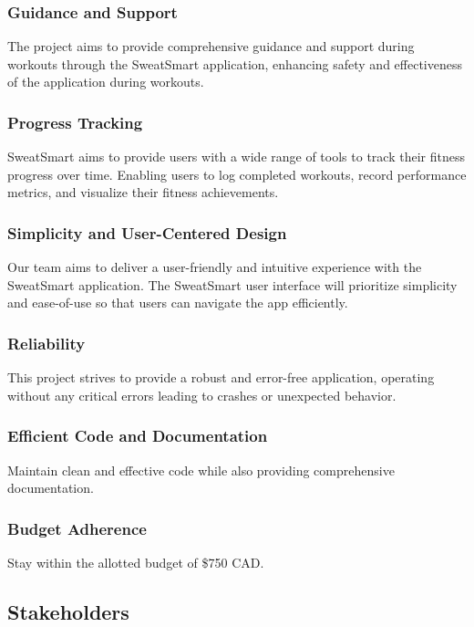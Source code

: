 \documentclass[12pt]{article}
\begin{document}
\subsubsection{Guidance and Support}
The project aims to provide comprehensive guidance and support during workouts through the SweatSmart application, enhancing safety and effectiveness of the application during workouts.

\subsubsection{Progress Tracking}
SweatSmart aims to provide users with a wide range of tools to track their fitness progress over time. Enabling users to log completed workouts, record performance metrics, and visualize their fitness achievements.

\subsubsection{Simplicity and User-Centered Design}
Our team aims to deliver a user-friendly and intuitive experience with the SweatSmart application. The SweatSmart user interface will prioritize simplicity and ease-of-use so that users can navigate the app efficiently.

\subsubsection{Reliability}
This project strives to provide a robust and error-free application, operating without any critical errors leading to crashes or unexpected behavior.

\subsubsection{Efficient Code and Documentation}
Maintain clean and effective code while also providing comprehensive documentation.

\subsubsection{Budget Adherence}
Stay within the allotted budget of \$750 CAD.

\subsection{Stakeholders}
\end{document}
